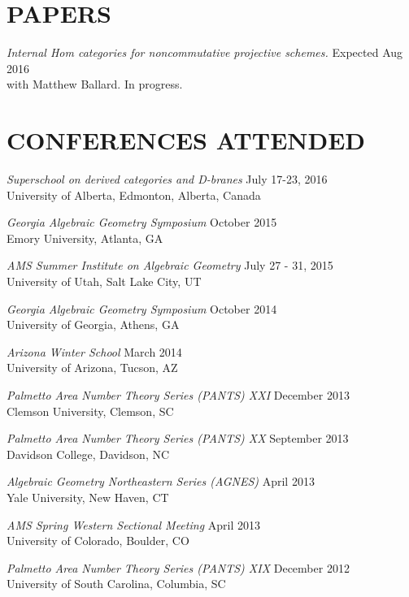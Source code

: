 \documentclass[line,overlapped]{res}
\begin{document}
\begin{resume}
 \section{PAPERS}
         {\sl  Internal Hom categories for noncommutative projective schemes.} \hfill Expected Aug 2016\\
	 with Matthew Ballard.  In progress.

 \newpage

 \section{CONFERENCES ATTENDED}
	 {\sl Superschool on derived categories and D-branes} \hfill July 17-23, 2016\\
	 University of Alberta, Edmonton, Alberta, Canada
         
         {\sl Georgia Algebraic Geometry Symposium} \hfill October 2015\\
         Emory University, Atlanta, GA

         {\sl AMS Summer Institute on Algebraic Geometry} \hfill July 27 - 31, 2015\\
         University of Utah, Salt Lake City, UT

         {\sl Georgia Algebraic Geometry Symposium} \hfill October 2014\\
         University of Georgia, Athens, GA

         {\sl Arizona Winter School} \hfill March 2014\\
         University of Arizona, Tucson, AZ

         {\sl Palmetto Area Number Theory Series (PANTS) XXI} \hfill December 2013\\
         Clemson University, Clemson, SC

         {\sl Palmetto Area Number Theory Series (PANTS) XX} \hfill September 2013\\
         Davidson College, Davidson, NC

         {\sl Algebraic Geometry Northeastern Series (AGNES)} \hfill April 2013\\
         Yale University, New Haven, CT

         {\sl AMS Spring Western Sectional Meeting} \hfill April 2013\\
         University of Colorado, Boulder, CO

         {\sl Palmetto Area Number Theory Series (PANTS) XIX} \hfill December 2012\\
         University of South Carolina, Columbia, SC


\end{resume}
\end{document}
